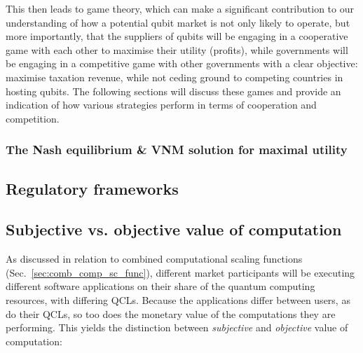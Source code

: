 This then leads to game theory, which can make a significant contribution to our understanding of how a potential qubit market is not only likely to operate, but more importantly, that the suppliers of qubits will be engaging in a cooperative game with each other to maximise their utility (profits), while governments will be engaging in a competitive game with other governments with a clear objective: maximise taxation revenue, while not ceding ground to competing countries in hosting qubits. The following sections will discuss these games and provide an indication of how various strategies perform in terms of cooperation and competition.

\subsubsection{The Nash equilibrium \& VNM solution for maximal utility}


%
%

\subsection{Regulatory frameworks} 


%
%

\subsection{Subjective vs. objective value of computation}\label{sec:sub_vs_obj}

As discussed in relation to combined computational scaling functions (Sec.~\ref{sec:comb_comp_sc_func}), different market participants will be executing different software applications on their share of the quantum computing resources, with differing QCLs. Because the applications differ between users, as do their QCLs, so too does the monetary value of the computations they are performing. This yields the distinction between \textit{subjective} and \textit{objective} value of computation:

